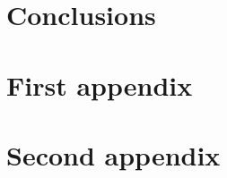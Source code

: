 \documentclass[final]{thesis} %
\begin{document}
							



\section{Conclusions}
\label{sec:conclusions}


\nocite{*}

\printbibliography

\newpage

\appendix

\section{First appendix}
\label{sec:first-appendix}

\lipsum[2-3]

\section{Second appendix}
\label{sec:second-appendix}

\lipsum[2-3]
\end{document}
